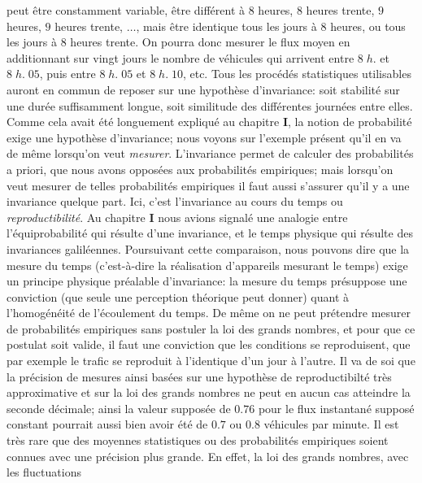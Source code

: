 peut \^etre constamment variable, \^etre diff\'erent \`a $8$ heures,  
$8$  heures trente, $9$ heures, $9$  heures trente, $\ldots$, mais \^etre 
identique tous les jours \`a $8$  heures, ou tous les jours \`a $8$  
heures  trente. On pourra donc mesurer le flux moyen en additionnant 
sur vingt jours le nombre de v\'ehicules qui arrivent entre $8\; h.$ et 
$8\; h.\; 05$, puis entre $8\; h.\; 05$ et $8\; h.\; 10$, etc. Tous les 
proc\'ed\'es statistiques utilisables auront en commun  de reposer sur 
une  hypoth\`ese d'invariance: soit stabilit\'e sur une  dur\'ee 
suffisamment longue, soit similitude des diff\'erentes  journ\'ees entre 
elles. Comme cela avait \'et\'e longuement expliqu\'e au chapitre {\bf I}, 
la  notion de probabilit\'e exige une hypoth\`ese d'invariance; nous 
voyons  sur l'exemple pr\'esent qu'il en va de m\^eme lorsqu'on veut {\it 
mesurer}.  
\medskip 
L'invariance permet de calculer des probabilit\'es a priori, que nous  
avons oppos\'ees aux probabilit\'es empiriques; mais lorsqu'on veut 
mesurer de telles probabilit\'es empiriques il faut aussi s'assurer qu'il  
y a une  invariance quelque part. Ici, c'est l'invariance au 
cours du temps ou {\it reproductibilit\'e}. 
\medskip 
Au chapitre {\bf I} nous avions signal\'e une analogie entre 
l'\'equiprobabilit\'e qui r\'esulte d'une invariance, et le temps physique 
qui r\'esulte des invariances galil\'eennes.  Poursuivant cette 
comparaison,  nous pouvons dire que la mesure du temps (c'est-\`a-dire 
la r\'ealisation d'appareils mesurant le temps) exige un principe 
physique pr\'ealable d'invariance:  la mesure du temps pr\'esuppose une 
conviction (que seule une perception th\'eorique peut donner) quant \`a 
l'homog\'en\'eit\'e de l'\'ecoulement du temps.  De  m\^eme on ne peut 
pr\'etendre mesurer de probabilit\'es empiriques sans postuler la loi 
des grands nombres,  et pour que ce postulat soit valide,  il faut une 
conviction que les conditions se reproduisent,  que par exemple le trafic 
se reproduit \`a l'identique d'un jour \`a l'autre.  
\medskip 
Il va de soi que la pr\'ecision de mesures ainsi bas\'ees sur une  
hypoth\`ese de reproductibilt\'e tr\`es approximative et sur la loi des  
grands nombres ne peut en aucun cas atteindre la seconde d\'ecimale; 
ainsi la valeur suppos\'ee de $0.76$ pour le flux instantan\'e suppos\'e 
constant pourrait aussi bien avoir \'et\'e de $0.7$ ou $0.8$ v\'ehicules  
par minute.  Il est tr\`es rare que des moyennes statistiques ou des 
probabilit\'es empiriques soient connues avec une pr\'ecision plus 
grande.  En effet,  la loi des grands nombres,  avec les fluctuations 
